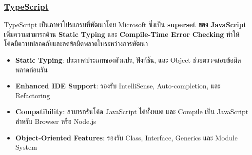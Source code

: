 \subsubsection{\textbf{\underline{TypeScript}}}
\begin{mypara}
    \indent TypeScript เป็นภาษาโปรแกรมที่พัฒนาโดย Microsoft ซึ่งเป็น \textbf{superset ของ JavaScript} เพิ่มความสามารถด้าน \textbf{Static Typing} และ \textbf{Compile-Time Error Checking} ทำให้โค้ดมีความปลอดภัยและลดข้อผิดพลาดในระหว่างการพัฒนา  
\end{mypara}
\begin{itemize}
    \item \textbf{Static Typing}: ประกาศประเภทของตัวแปร, ฟังก์ชัน, และ Object ช่วยตรวจสอบข้อผิดพลาดก่อนรัน
    \item \textbf{Enhanced IDE Support}: รองรับ IntelliSense, Auto-completion, และ Refactoring
    \item \textbf{Compatibility}: สามารถรันโค้ด JavaScript ได้ทั้งหมด และ Compile เป็น JavaScript สำหรับ Browser หรือ Node.js
    \item \textbf{Object-Oriented Features}: รองรับ Class, Interface, Generics และ Module System
\end{itemize}

